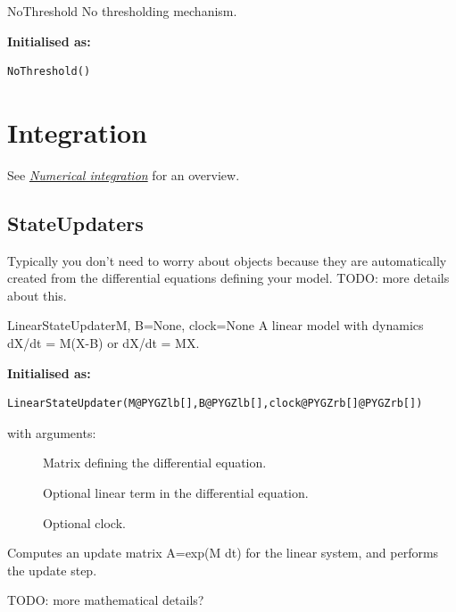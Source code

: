 \documentclass[letterpaper,10pt,english]{manual}
\begin{document}
\hypertarget{brian.NoThreshold}{}\begin{classdesc}{NoThreshold}{}
No thresholding mechanism.

\textbf{Initialised as:}

\begin{Verbatim}[commandchars=@\[\]]
NoThreshold()
\end{Verbatim}
\end{classdesc}

\resetcurrentobjects
{}

\hypertarget{integration}{}\section{Integration}

See \hyperlink{numerical-integration}{\emph{Numerical integration}} for an overview.


\subsection{StateUpdaters}

Typically you don't need to worry about  objects
because they are automatically created from the differential
equations defining your model. TODO: more details about this.

\hypertarget{brian.LinearStateUpdater}{}\begin{classdesc}{LinearStateUpdater}{M, B=None, clock=None}
A linear model with dynamics dX/dt = M(X-B) or dX/dt = MX.

\textbf{Initialised as:}

\begin{Verbatim}[commandchars=@\[\]]
LinearStateUpdater(M@PYGZlb[],B@PYGZlb[],clock@PYGZrb[]@PYGZrb[])
\end{Verbatim}

with arguments:
\begin{description}
\item[]
Matrix defining the differential equation.

\item[]
Optional linear term in the differential equation.

\item[]
Optional clock.

\end{description}

Computes an update matrix A=exp(M dt) for the linear system,
and performs the update step.

TODO: more mathematical details?
\end{classdesc}
\end{document}
